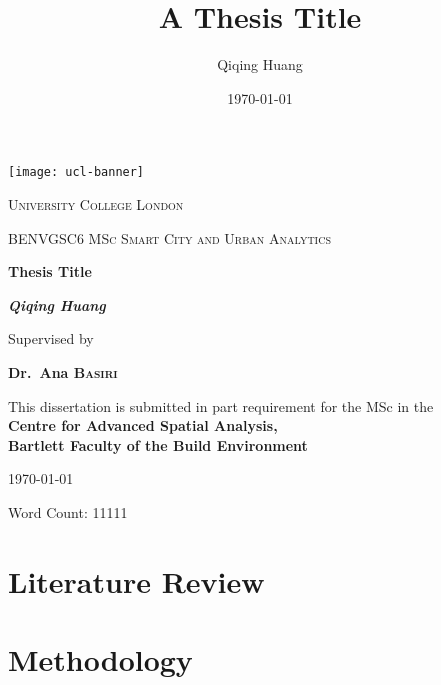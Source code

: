 \documentclass[11pt,a4paper ,oneside ,openany]{book}
\begin{document}
\title{A Thesis Title}
\author{Qiqing Huang}
\date{\today}
\begin{titlepage}
    \centering
    \vspace*{-6.55\baselineskip}
    \hspace*{-0.27\textwidth}
    \texttt{[image: ucl-banner]}
    \par\vspace*{5\baselineskip}
    {\scshape\LARGE University College London \par}
	\vspace{0.5cm}
	{\scshape\large BENVGSC6 MSc Smart City and Urban Analytics\par}
	\vspace{3cm}
	{\huge\bfseries Thesis Title\par}
	\vspace{3cm}
	{\Large\bfseries\itshape Qiqing Huang\par}
	\vspace{3cm}
	{Supervised by\par}
    {\bfseries Dr.~Ana \textsc{Basiri}\par}
    \vspace{0.5cm}
    {This dissertation is
    submitted in part requirement for the MSc 
    in the \\
    \bfseries{Centre for Advanced
    Spatial Analysis}, \\
    \bfseries{Bartlett Faculty of the
    Build Environment}\par}
	\vfill
    {\today\par}
    {Word Count: 11111\par}
\end{titlepage}

\frontmatter


\tableofcontents
\listoffigures
\listoftables


\mainmatter


\chapter{Literature Review}
\label{chapter2}


\chapter{Methodology}
\label{chapter3}

\end{document}
